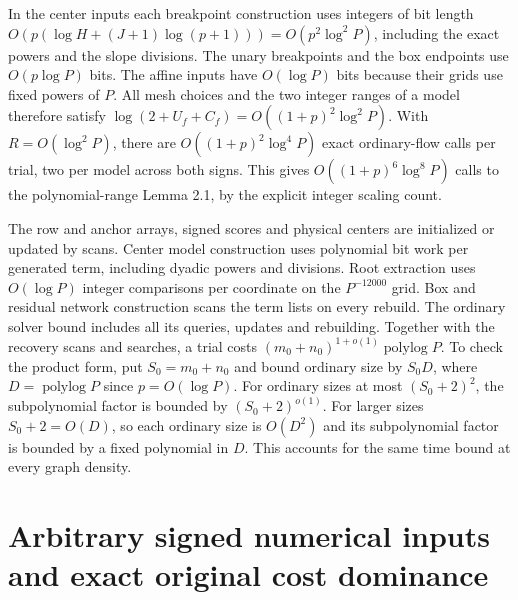 \documentclass[11pt]{article}
\begin{document}
In the center inputs each breakpoint construction uses integers of bit length \(O(p(\log H+(J+1)\log(p+1)))=O(p^2\log^2 P)\), including the exact powers and the slope divisions. The unary breakpoints and the box endpoints use \(O(p\log P)\) bits. The affine inputs have \(O(\log P)\) bits because their grids use fixed powers of \(P\). All mesh choices and the two integer ranges of a model therefore satisfy \(\log(2+U_f+C_f)=O((1+p)^2\log^2 P)\). With \(R=O(\log^2 P)\), there are \(O((1+p)^2\log^4 P)\) exact ordinary-flow calls per trial, two per model across both signs. This gives \(O((1+p)^6\log^8 P)\) calls to the polynomial-range Lemma 2.1, by the explicit integer scaling count.

The row and anchor arrays, signed scores and physical centers are initialized or updated by scans. Center model construction uses polynomial bit work per generated term, including dyadic powers and divisions. Root extraction uses \(O(\log P)\) integer comparisons per coordinate on the \(P^{-12000}\) grid. Box and residual network construction scans the term lists on every rebuild. The ordinary solver bound includes all its queries, updates and rebuilding. Together with the recovery scans and searches, a trial costs \((m_0+n_0)^{1+o(1)}\operatorname{polylog}P\). To check the product form, put \(S_0=m_0+n_0\) and bound ordinary size by \(S_0D\), where \(D=\operatorname{polylog}P\) since \(p=O(\log P)\). For ordinary sizes at most \((S_0+2)^2\), the subpolynomial factor is bounded by \((S_0+2)^{o(1)}\). For larger sizes \(S_0+2=O(D)\), so each ordinary size is \(O(D^2)\) and its subpolynomial factor is bounded by a fixed polynomial in \(D\). This accounts for the same time bound at every graph density.

\hypertarget{arbitrary-signed-numerical-inputs-and-exact-original-cost-dominance}{%
\section*{Arbitrary signed numerical inputs and exact original cost dominance}\label{arbitrary-signed-numerical-inputs-and-exact-original-cost-dominance}}
\end{document}
